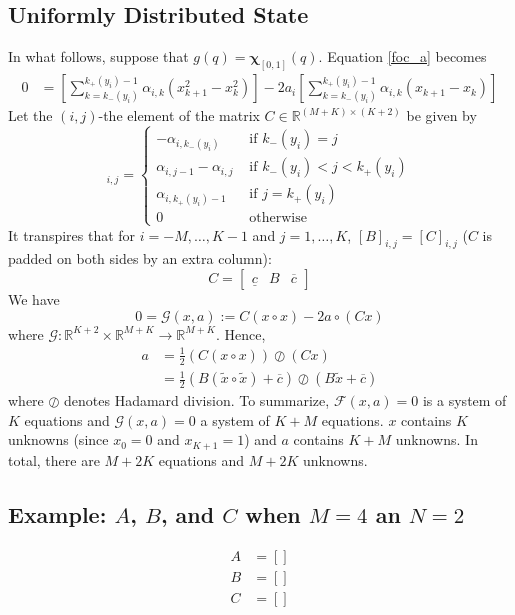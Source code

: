 \documentclass[12pt]{article}
\begin{document}
\subsection{Uniformly Distributed State}
In what follows, suppose that $g(q)=\mathbf{\chi}_{[0,1]}(q)$. Equation \ref{foc_a} becomes
\begin{align}
	0&=\left[\sum_{k=k_{-}(y_{i})}^{k_{+}(y_{i})-1}{\alpha_{i,k}\left(x_{k+1}^{2}-x_{k}^{2}\right)}\right]-2a_{i}\left[\sum_{k=k_{-}(y_{i})}^{k_{+}(y_{i})-1}{\alpha_{i,k}(x_{k+1}-x_{k})}\right]
\end{align}
Let the $(i,j)$-the element of the matrix $C\in\mathbb{R}^{(M+K)\times(K+2)}$ be given by
\begin{equation}
	[C]_{i,j}=
	\begin{cases}
		-\alpha_{i,k_{-}(y_{i})} & \text{ if } k_{-}(y_{i})=j \\
		\alpha_{i,j-1}-\alpha_{i,j} & \text{ if } k_{-}(y_{i})<j<k_{+}(y_{i})\\
		\alpha_{i,k_{+}(y_{i})-1} & \text{ if } j=k_{+}(y_{i})\\
		0 & \text{ otherwise }
	\end{cases}
\end{equation}
It transpires that for $i=-M,\ldots,K-1$ and $j=1,\ldots,K$, $[B]_{i,j}=[C]_{i,j}$ ($C$ is padded on both sides by an extra column): 
\begin{equation}
	C = 
	\left[
		\begin{array}{ccc}
			\underline{c} & B & \overline{c}
		\end{array}
	\right]
\end{equation}
We have 
\begin{equation}\label{eq:G_map}
	0=\mathcal{G}(x,a):=C(x\circ x)-2a\circ (Cx)
\end{equation}
where $\mathcal{G}:\mathbb{R}^{K+2}\times\mathbb{R}^{M+K}\rightarrow\mathbb{R}^{M+K}$. Hence,
\begin{align}
	a&=\frac{1}{2}(C(x\circ x))\oslash(Cx)\\
	&=\frac{1}{2}(B(\widetilde{x}\circ \widetilde{x})+\overline{c})\oslash(B\widetilde{x}+\overline{c})
\end{align}
where $\oslash$ denotes Hadamard division. To summarize, $\mathcal{F}(x,a)=0$ is a system of $K$ equations and $\mathcal{G}(x,a)=0$ a system of $K+M$ equations. $x$ contains $K$ unknowns (since $x_{0}=0$ and $x_{K+1}=1$) and $a$ contains $K+M$ unknowns. In total, there are $M+2K$ equations and $M+2K$ unknowns. 
\pagebreak
\begin{landscape}
	\subsection{Example: $A$, $B$, and $C$ when $M=4$ an $N=2$}
	\tiny
	\begin{align}
		A&=\left[\right]\\
		B&=\left[\right]\\
		C&=\left[\right]
	\end{align}
\end{landscape}
\end{document}
